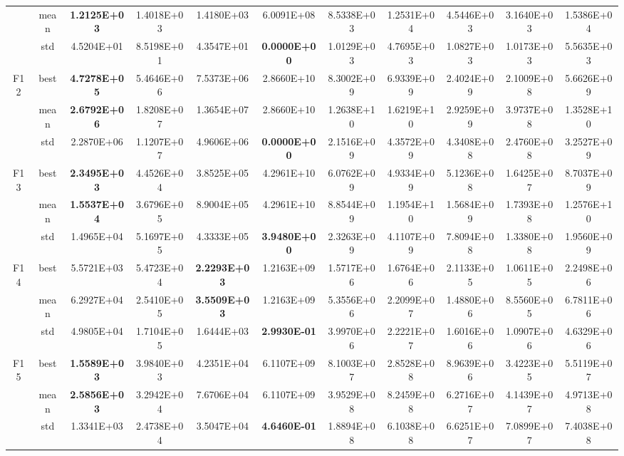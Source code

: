 \documentclass{wzuthesis}
\begin{document}
\begin{longtable}{ccccccccccc}
          & mean  & \textbf{1.2125E+03} & 1.4018E+03 & 1.4180E+03 & 6.0091E+08 & 8.5338E+03 & 1.2531E+04 & 4.5446E+03 & 3.1640E+03 & 1.5386E+04 \\
          & std   & 4.5204E+01 & 8.5198E+01 & 4.3547E+01 & \textbf{0.0000E+00} & 1.0129E+03 & 4.7695E+03 & 1.0827E+03 & 1.0173E+03 & 5.5635E+03 \\
    \multirow{3}[0]{*}{F12} & best  & \textbf{4.7278E+05} & 5.4646E+06 & 7.5373E+06 & 2.8660E+10 & 8.3002E+09 & 6.9339E+09 & 2.4024E+09 & 2.1009E+08 & 5.6626E+09 \\
          & mean  & \textbf{2.6792E+06} & 1.8208E+07 & 1.3654E+07 & 2.8660E+10 & 1.2638E+10 & 1.6219E+10 & 2.9259E+09 & 3.9737E+08 & 1.3528E+10 \\
          & std   & 2.2870E+06 & 1.1207E+07 & 4.9606E+06 & \textbf{0.0000E+00} & 2.1516E+09 & 4.3572E+09 & 4.3408E+08 & 2.4760E+08 & 3.2527E+09 \\
    \multirow{3}[0]{*}{F13} & best  & \textbf{2.3495E+03} & 4.4526E+04 & 3.8525E+05 & 4.2961E+10 & 6.0762E+09 & 4.9334E+09 & 5.1236E+08 & 1.6425E+07 & 8.7037E+09 \\
          & mean  & \textbf{1.5537E+04} & 3.6796E+05 & 8.9004E+05 & 4.2961E+10 & 8.8544E+09 & 1.1954E+10 & 1.5684E+09 & 1.7393E+08 & 1.2576E+10 \\
          & std   & 1.4965E+04 & 5.1697E+05 & 4.3333E+05 & \textbf{3.9480E+00} & 2.3263E+09 & 4.1107E+09 & 7.8094E+08 & 1.3380E+08 & 1.9560E+09 \\
    \multirow{3}[0]{*}{F14} & best  & 5.5721E+03 & 5.4723E+04 & \textbf{2.2293E+03} & 1.2163E+09 & 1.5717E+06 & 1.6764E+06 & 2.1133E+05 & 1.0611E+05 & 2.2498E+06 \\
          & mean  & 6.2927E+04 & 2.5410E+05 & \textbf{3.5509E+03} & 1.2163E+09 & 5.3556E+06 & 2.2099E+07 & 1.4880E+06 & 8.5560E+05 & 6.7811E+06 \\
          & std   & 4.9805E+04 & 1.7104E+05 & 1.6444E+03 & \textbf{2.9930E-01} & 3.9970E+06 & 2.2221E+07 & 1.6016E+06 & 1.0907E+06 & 4.6329E+06 \\
    \multirow{3}[0]{*}{F15} & best  & \textbf{1.5589E+03} & 3.9840E+03 & 4.2351E+04 & 6.1107E+09 & 8.1003E+07 & 2.8528E+08 & 8.9639E+06 & 3.4223E+05 & 5.5119E+07 \\
          & mean  & \textbf{2.5856E+03} & 3.2942E+04 & 7.6706E+04 & 6.1107E+09 & 3.9529E+08 & 8.2459E+08 & 6.2716E+07 & 4.1439E+07 & 4.9713E+08 \\
          & std   & 1.3341E+03 & 2.4738E+04 & 3.5047E+04 & \textbf{4.6460E-01} & 1.8894E+08 & 6.1038E+08 & 6.6251E+07 & 7.0899E+07 & 7.4038E+08 \\

\end{longtable}
\end{document}
